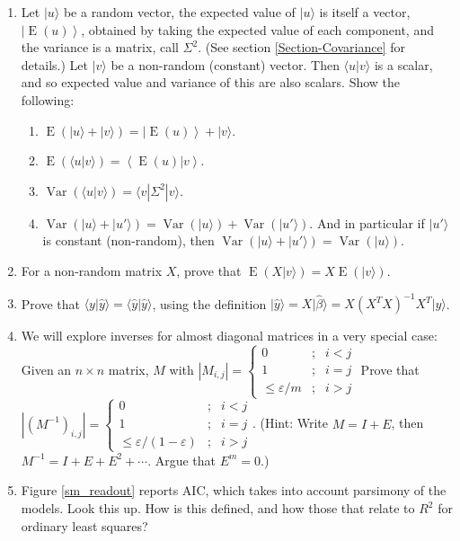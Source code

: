 \documentclass{amsbook}
\begin{document}
\begin{enumerate}
\item\label{random-constant} Let $|u\rangle$ be a random vector, the expected value of $|u\rangle$ is itself a vector, $\left|\operatorname{E}(u)\right\rangle$, obtained by taking the expected value of each component, and the variance is a matrix, call $\Sigma^2$.  (See section \ref{Section-Covariance} for details.)  Let $|v\rangle$ be a non-random (constant) vector.  Then $\langle u|v\rangle$ is a scalar, and so expected value and variance of this are also scalars.  Show the following:
\begin{enumerate}[a]
  \item $\operatorname{E}\left(|u\rangle+|v\rangle\right)=\left|\operatorname{E}(u)\right\rangle+|v\rangle$.
  \item $\operatorname{E}\left(\langle u|v\rangle\right)=\left\langle\operatorname{E}(u)|v\right\rangle$.
  \item $\operatorname{Var}\left(\langle u|v\rangle\right)=\langle v|\Sigma^2|v\rangle$.
  \item $\operatorname{Var}\left(|u\rangle+|u'\rangle\right)=\operatorname{Var}(|u\rangle)+\operatorname{Var}(|u'\rangle)$.  And in particular if $|u'\rangle$ is constant (non-random), then $\operatorname{Var}\left(|u\rangle+|u'\rangle\right)=\operatorname{Var}(|u\rangle)$.
\end{enumerate}
\item\label{random-constant-2} For a non-random matrix $X$, prove that $\operatorname{E}\left(X|v\rangle\right)=X\operatorname{E}\left(|v\rangle\right)$.
\item\label{y-hat-ex-1} Prove that $\langle y|\hat y\rangle=\langle \hat y|\hat y\rangle$, using the definition $|\hat y\rangle=X|\hat\beta\rangle=X\left(X^TX\right)^{-1}X^T|y\rangle$.
\item We will explore inverses for almost diagonal matrices in a very special case:  Given an $n\times n$ matrix, $M$ with $\left|M_{i,j}\right|=\left\{\begin{array}{rcl} 0&;&i<j\\1&;&i=j\\\leq\varepsilon/m &;&i>j\end{array}\right.$  Prove that $\left|\left(M^{-1}\right)_{i,j}\right|=\left\{\begin{array}{rcl} 0&;&i<j\\1&;&i=j\\\leq\varepsilon/\left(1-\varepsilon\right) &;&i>j\end{array}\right.$.  (Hint: Write $M=I+E$, then $M^{-1}=I+E+E^2+\cdots$.  Argue that $E^m=0$.)
\item Figure \ref{sm_readout} reports AIC, which takes into account parsimony of the models.  Look this up.  How is this defined, and how those that relate to $R^2$ for ordinary least squares?
\end{enumerate}
\end{document}
